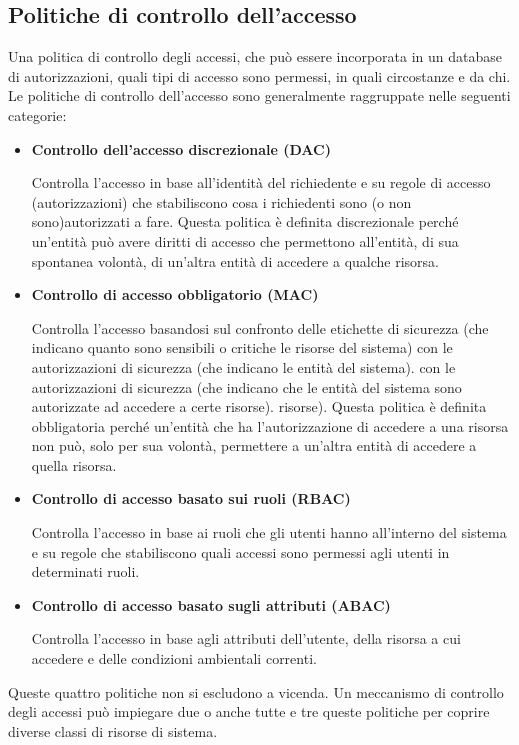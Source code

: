 \subsection{Politiche di controllo dell'accesso}
Una politica di controllo degli accessi, che può essere incorporata in un database di autorizzazioni, quali tipi di accesso sono permessi, in quali circostanze e da chi.
\singlespacing
Le politiche di controllo dell'accesso sono generalmente raggruppate nelle seguenti categorie:
\begin{itemize}
    \item \textbf{Controllo dell'accesso discrezionale (DAC)}
    
    Controlla l'accesso in base all'identità del richiedente e su regole di accesso (autorizzazioni) che stabiliscono cosa i richiedenti sono (o non sono)autorizzati a fare. Questa politica è definita discrezionale perché un'entità può avere diritti di accesso che permettono all'entità, di sua spontanea volontà, di un'altra entità di accedere a qualche risorsa.
    
    \item \textbf{Controllo di accesso obbligatorio (MAC)}
    
    
    Controlla l'accesso basandosi sul confronto delle etichette di sicurezza (che indicano quanto sono sensibili o critiche le risorse del sistema) con le autorizzazioni di sicurezza (che indicano le entità del sistema). con le autorizzazioni di sicurezza (che indicano che le entità del sistema sono autorizzate ad accedere a certe risorse). risorse). Questa politica è definita obbligatoria perché un'entità che ha l'autorizzazione di accedere a una risorsa non può, solo per sua volontà, permettere a un'altra entità di accedere a quella risorsa.
    
    \item \textbf{Controllo di accesso basato sui ruoli (RBAC)}
    
    Controlla l'accesso in base ai ruoli che gli utenti hanno all'interno del sistema e su regole che stabiliscono quali accessi sono permessi agli utenti in determinati ruoli.
    
    \item \textbf{Controllo di accesso basato sugli attributi (ABAC)}
    
    Controlla l'accesso in base agli attributi dell'utente, della risorsa a cui accedere e delle condizioni ambientali correnti.
\end{itemize}
\singlespacing
Queste quattro politiche non si escludono a vicenda. Un meccanismo di controllo degli accessi può impiegare due o anche tutte e tre queste politiche per coprire diverse classi di risorse di sistema.
\newpage
